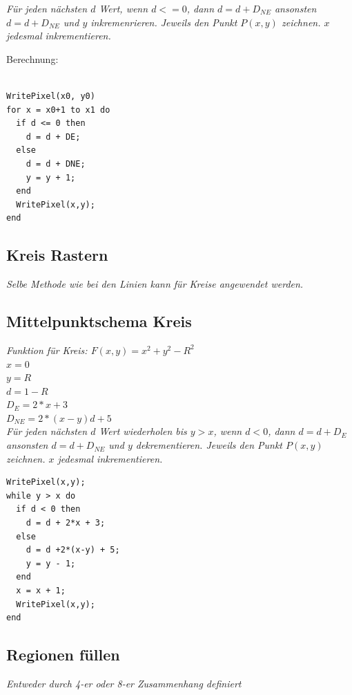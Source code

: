 \textit{
    Für jeden nächsten $d$ Wert, wenn $d <= 0$,
    dann $d = d + D_{NE}$ ansonsten $d = d + D_{NE}$ und $y$ inkremenrieren.
    Jeweils den Punkt $P(x,y)$ zeichnen. $x$ jedesmal inkrementieren.
}

Berechnung:
\begin{lstlisting}

WritePixel(x0, y0)
for x = x0+1 to x1 do
  if d <= 0 then
    d = d + DE;
  else
    d = d + DNE;
    y = y + 1;
  end
  WritePixel(x,y);
end
\end{lstlisting}

\subsection{Kreis Rastern}

\textit{Selbe Methode wie bei den Linien kann für Kreise angewendet werden.}

\subsection{Mittelpunktschema Kreis}

\textit{Funktion für Kreis: $F(x,y) = x^2 + y^2 - R^2$}\\

$x = 0$\\
$y = R$\\
$d = 1 - R$\\
$D_{E} = 2*x + 3$\\
$D_{NE} = 2*(x-y)d + 5$\\

\textit{
    Für jeden nächsten $d$ Wert wiederholen bis $y > x$, wenn $d < 0$,
    dann $d = d + D_{E}$ ansonsten $d = d + D_{NE}$ und $y$ dekrementieren.
    Jeweils den Punkt $P(x,y)$ zeichnen. $x$ jedesmal inkrementieren.
}

\begin{lstlisting}
WritePixel(x,y); 
while y > x do
  if d < 0 then
    d = d + 2*x + 3; 
  else
    d = d +2*(x-y) + 5;
    y = y - 1;
  end
  x = x + 1; 
  WritePixel(x,y); 
end
\end{lstlisting}

\subsection{Regionen füllen}

\textit{Entweder durch 4-er oder 8-er Zusammenhang definiert}

